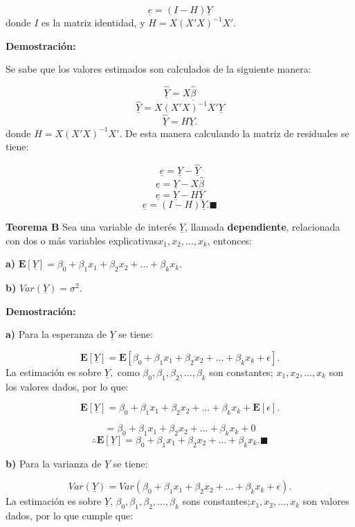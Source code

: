 \documentclass[a4paper,oneside,openany]{book}
\begin{document}
\[\underline{e}=(I-H)\underline{Y}\] donde \(I\) es la matriz identidad,
y \(H=X(X'X)^{-1}X'.\)

\textbf{Demostración:}

Se sabe que los valores estimados son calculados de la siguiente manera:

\[\underline{\hat{Y}}=X\underline{\hat{\beta}}\]
\[\underline{\hat{Y}}=X(X'X)^{-1}X'\underline{Y}\]
\[\underline{\hat{Y}}=H\underline{Y}.\] donde \(H=X(X'X)^{-1}X'.\) De
esta manera calculando la matriz de residuales se tiene:

\[\underline{e}=\underline{Y}-\underline{\hat{Y}}\]
\[\underline{e}=\underline{Y}-X\underline{\hat{\beta}}\]
\[\underline{e}=\underline{Y}-H\underline{Y}\]
\[\underline{e}=(I-H)\underline{Y}.\blacksquare\]

\textbf{Teorema B} Sea una variable de interés \(\underline{Y}\),
llamada \textbf{dependiente}, relacionada con dos o más variables
explicativas\(x_{1},x_{2},\ldots,x_{k}\), entonces:

\textbf{a)}
\(\mathbf{E}[\underline{Y}]= \beta_{0}+\beta_{1}x_{1}+\beta_{2}x_{2}+ \ldots + \beta_{k}x_{k}.\)

\textbf{b)} \(Var(\underline{Y})= \sigma^2.\)

\textbf{Demostración:}

\textbf{a)} Para la esperanza de \(\underline{Y}\) se tiene:

\[\mathbf{E}[\underline{Y}]=\mathbf{E}[\beta_{0}+\beta_{1}x_{1}+\beta_{2}x_{2}+ \ldots +\beta_{k}x_{k}+\epsilon].\]
La estimación es sobre \(\underline{Y},\) como
\(\beta_{0},\beta_{1},\beta_{2},\ldots,\beta_{k}\) son constantes;
\(x_{1},x_{2}, \ldots,x_{k}\) son los valores dados, por lo que:

\[\mathbf{E}[\underline{Y}]=\beta_{0}+\beta_{1}x_{1}+\beta_{2}x_{2}+ \ldots +\beta_{k}x_{k}+\mathbf{E}[\epsilon].\]

\[=\beta_{0}+\beta_{1}x_{1}+\beta_{2}x_{2}+ \ldots +\beta_{k}x_{k}+0\]
\[\therefore \mathbf{E}[\underline{Y}]= \beta_{0}+\beta_{1}x_{1}+\beta_{2}x_{2}+ \ldots + \beta_{k}x_{k}. \blacksquare\]

\textbf{b)} Para la varianza de \(\underline{Y}\) se tiene:

\[Var(\underline{Y})=Var\left( \beta_{0}+\beta_{1}x_{1}+\beta_{2}x_{2}+ \ldots + \beta_{k}x_{k}+ \epsilon\right).\]
La estimación es sobre \(\underline{Y}\),
\(\beta_{0},\beta_{1},\beta_{2},\ldots,\beta_{k}\) sons
constantes;\(x_{1},x_{2},\ldots,x_{k}\) son valores dados, por lo que
cumple que:
\end{document}

